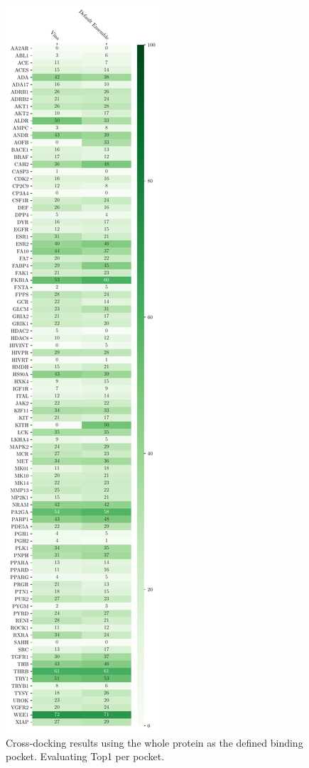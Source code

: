 \documentclass[journal=jcisd8,manuscript=article]{achemso}
\begin{document}
\begin{figure}
    \centering
    \includegraphics[height=0.9\textheight]{figures/crossdocking/whole_ptn_top1_per_pocket.pdf}
    \caption{Cross-docking results using the whole protein as the defined binding pocket. Evaluating Top1 per pocket.}
    \label{fig:Thresh_PerPock}
\end{figure}
\end{document}
